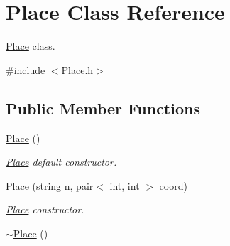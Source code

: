 \hypertarget{class_place}{\section{Place Class Reference}
\label{class_place}
}


\hyperlink{class_place}{Place} class.  




{\ttfamily \#include $<$Place.\+h$>$}

\subsection*{Public Member Functions}
\begin{DoxyCompactItemize}
\item 
\hypertarget{class_place_ab5ae86c31e3a4c91800fb396d38e7a2b}{\hyperlink{class_place_ab5ae86c31e3a4c91800fb396d38e7a2b}{Place} ()}\label{class_place_ab5ae86c31e3a4c91800fb396d38e7a2b}

\begin{DoxyCompactList}\small\item\em \hyperlink{class_place}{Place} default constructor. \end{DoxyCompactList}\item 
\hyperlink{class_place_ae408c72c18378fea3139db133d8bf5a3}{Place} (string n, pair$<$ int, int $>$ coord)
\begin{DoxyCompactList}\small\item\em \hyperlink{class_place}{Place} constructor. \end{DoxyCompactList}\item 
\hypertarget{class_place_a190a59c6249d3b30d7ecfa8babe411ff}{\hyperlink{class_place_a190a59c6249d3b30d7ecfa8babe411ff}{$\sim$\+Place} ()}\label{class_place_a190a59c6249d3b30d7ecfa8babe411ff}


\end{DoxyCompactItemize}
